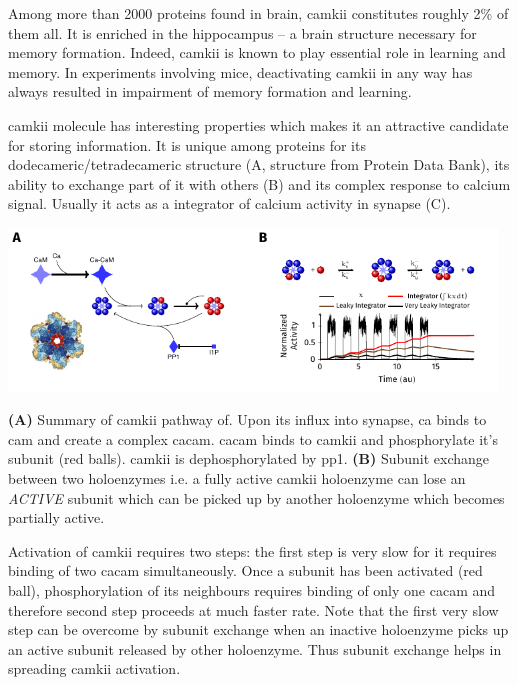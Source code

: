 \documentclass[]{resonance}
\begin{document}
 {
    Among more than 2000 proteins found in brain, \gls{camkii} constitutes
    roughly 2\% of them all. It is enriched in the hippocampus -- a brain
    structure necessary for memory formation. Indeed, \gls{camkii} is known to
    play essential role in learning and memory. In experiments involving mice,
    deactivating \gls{camkii} in any way has always resulted in impairment of
    memory formation and learning. 

    \gls{camkii} molecule has interesting properties which makes it an
    attractive candidate for storing information. It is unique among proteins
    for its dodecameric/tetradecameric structure (A, structure from Protein Data Bank),
    its ability to exchange part of it with others (B) and its complex response
    to calcium signal.  Usually it acts as a integrator of calcium activity in
    synapse (C).

    \includegraphics[width=13cm]{./figures/camkii_properties.pdf}

    \textbf{(A)} Summary of \gls{camkii} pathway of. Upon its influx into
    synapse, \gls{ca} binds to \gls{cam} and create a complex \gls{cacam}.
    \gls{cacam} binds to \gls{camkii} and phosphorylate it's subunit (red
    balls). \gls{camkii} is dephosphorylated by \gls{pp1}. \textbf{(B)} Subunit
    exchange between two holoenzymes i.e. a fully active \gls{camkii} holoenzyme
    can lose an \textit{ACTIVE} subunit which can be picked up by another
    holoenzyme which becomes partially active. 
    
    Activation of \gls{camkii} requires two steps: the first step is very slow
    for it requires binding of two \gls{cacam} simultaneously. Once a subunit
    has been activated (red ball), phosphorylation of its neighbours requires
    binding of only one \gls{cacam} and therefore second step proceeds at  much
    faster rate.  Note that the first very slow step can be overcome by subunit
    exchange when an inactive holoenzyme picks up an active subunit released by
    other holoenzyme. Thus subunit exchange helps in spreading \gls{camkii}
    activation. 

}
\end{document}
